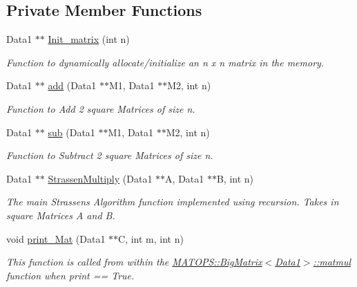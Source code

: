 \subsection*{Private Member Functions}
\begin{DoxyCompactItemize}
\item 
Data1 $\ast$$\ast$ \hyperlink{classMATOPS_1_1BigMatrix_a2730be4ce100cfdbaf1240703bd9cfb9}{Init\+\_\+matrix} (int n)
\begin{DoxyCompactList}\small\item\em Function to dynamically allocate/initialize an n x n matrix in the memory. \end{DoxyCompactList}\item 
Data1 $\ast$$\ast$ \hyperlink{classMATOPS_1_1BigMatrix_a175eecea05e419357d7475f5e3e938da}{add} (Data1 $\ast$$\ast$M1, Data1 $\ast$$\ast$M2, int n)
\begin{DoxyCompactList}\small\item\em Function to Add 2 square Matrices of size n. \end{DoxyCompactList}\item 
Data1 $\ast$$\ast$ \hyperlink{classMATOPS_1_1BigMatrix_a5c89e7f360fb3cc32abbf6f1d430fb1f}{sub} (Data1 $\ast$$\ast$M1, Data1 $\ast$$\ast$M2, int n)
\begin{DoxyCompactList}\small\item\em Function to Subtract 2 square Matrices of size n. \end{DoxyCompactList}\item 
Data1 $\ast$$\ast$ \hyperlink{classMATOPS_1_1BigMatrix_a71c665c80a1ca3731bd0d8ce37f0ace1}{Strassen\+Multiply} (Data1 $\ast$$\ast$A, Data1 $\ast$$\ast$B, int n)
\begin{DoxyCompactList}\small\item\em The main Strassen\textquotesingle{}s Algorithm function implemented using recursion. Takes in square Matrices A and B. \end{DoxyCompactList}\item 
void \hyperlink{classMATOPS_1_1BigMatrix_af5223558c09e6c3c2fd3bcc5ccd08382}{print\+\_\+\+Mat} (Data1 $\ast$$\ast$C, int m, int n)
\begin{DoxyCompactList}\small\item\em This function is called from within the \hyperlink{classMATOPS_1_1BigMatrix_ac793236874a8ccfd66e21006011b9cff}{M\+A\+T\+O\+P\+S\+::\+Big\+Matrix$<$\+Data1$>$\+::matmul} function when print == True. \end{DoxyCompactList}\item 
$$
\end{DoxyCompactItemize}
